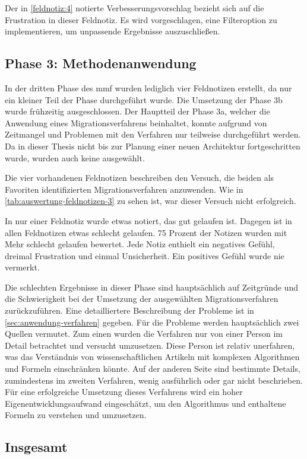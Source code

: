 Der in \cref{feldnotiz:4} notierte Verbesserungsvorschlag bezieht sich auf die Frustration in dieser Feldnotiz. 
Es wird vorgeschlagen, eine Filteroption zu implementieren, um unpassende Ergebnisse auszuschließen.

\subsection{Phase 3: Methodenanwendung}

In der dritten Phase des \gls{mmf} wurden lediglich vier Feldnotizen erstellt, da nur ein kleiner Teil der Phase durchgeführt wurde.
Die Umsetzung der Phase 3b wurde frühzeitig ausgeschlossen. 
Der Hauptteil der Phase 3a, welcher die Anwendung eines Migrationsverfahrens beinhaltet, konnte aufgrund von Zeitmangel und Problemen mit den Verfahren nur teilweise durchgeführt werden.
Da in dieser Thesis nicht bis zur Planung einer neuen Architektur fortgeschritten wurde, wurden auch keine \bpp ausgewählt.

Die vier vorhandenen Feldnotizen beschreiben den Versuch, die beiden als Favoriten identifizierten Migrationsverfahren anzuwenden. 
Wie in \cref{tab:auswertung-feldnotizen-3} zu sehen ist, war dieser Versuch nicht erfolgreich.

In nur einer Feldnotiz wurde etwas notiert, das gut gelaufen ist.
Dagegen ist in allen Feldnotizen etwas schlecht gelaufen.
75 Prozent der Notizen wurden mit \glqq Mehr schlecht gelaufen\grqq{} bewertet.
Jede Notiz enthielt ein negatives Gefühl, dreimal Frustration und einmal Unsicherheit. 
Ein positives Gefühl wurde nie vermerkt.

Die schlechten Ergebnisse in dieser Phase sind hauptsächlich auf Zeitgründe und die Schwierigkeit bei der Umsetzung der ausgewählten Migrationsverfahren zurückzuführen.
Eine detailliertere Beschreibung der Probleme ist in \cref{sec:anwendung-verfahren} gegeben.
Für die Probleme werden hauptsächlich zwei Quellen vermutet.
Zum einen wurden die Verfahren nur von einer Person im Detail betrachtet und versucht umzusetzen.
Diese Person ist relativ unerfahren, was das Verständnis von wissenschaftlichen Artikeln mit komplexen Algorithmen und Formeln einschränken könnte.
Auf der anderen Seite sind bestimmte Details, zumindestens im zweiten Verfahren, wenig ausführlich oder gar nicht beschrieben.
Für eine erfolgreiche Umsetzung dieses Verfahrens wird ein hoher Eigenentwicklungsaufwand eingeschätzt, um den Algorithmus und enthaltene Formeln zu verstehen und umzusetzen.

\subsection{Insgesamt}

